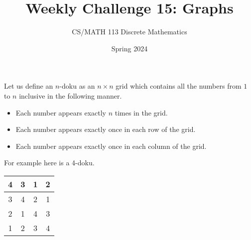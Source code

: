 \documentclass[a4paper,addpoints]{exam}
\title{Weekly Challenge 15: Graphs}
\author{CS/MATH 113 Discrete Mathematics}
\date{Spring 2024}
\begin{document}
\maketitle

\begin{questions}
  Let us define an $n$-doku as an $n\times n$ grid which contains all the numbers from $1$ to $n$ inclusive in the following manner.
  \begin{itemize}
  \item Each number appears exactly $n$ times in the grid.
  \item Each number appears exactly once in each row of the grid.
  \item Each number appears exactly once in each column of the grid.
  \end{itemize}
  For example here is a 4-doku.
  
  \begin{center}
    \begin{tabular}{|c|c|c|c|} \hline 
      4&  3&  1& 2\\ \hline
      3&  4&  2& 1\\ \hline 
      2&  1&  4& 3\\ \hline 
      1&  2&  3& 4\\ \hline 
    \end{tabular}
  \end{center}
  
\end{questions}
\end{document}
